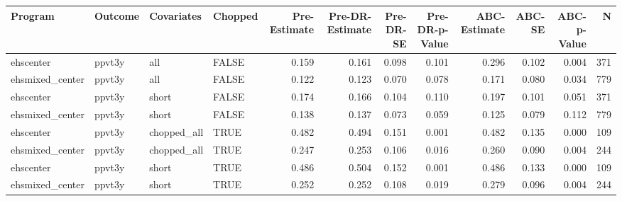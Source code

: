 \begin{table}[ht]
\centering
\begin{tabular}{llllrrrrrrrr}
  \hline
Program & Outcome & Covariates & Chopped & Pre-Estimate & Pre-DR-Estimate & Pre-DR-SE & Pre-DR-p-Value & ABC-Estimate & ABC-SE & ABC-p-Value & N \\ 
  \hline
ehscenter & ppvt3y & all & FALSE & 0.159 & 0.161 & 0.098 & 0.101 & 0.296 & 0.102 & 0.004 & 371 \\ 
  ehsmixed\_center & ppvt3y & all & FALSE & 0.122 & 0.123 & 0.070 & 0.078 & 0.171 & 0.080 & 0.034 & 779 \\ 
  ehscenter & ppvt3y & short & FALSE & 0.174 & 0.166 & 0.104 & 0.110 & 0.197 & 0.101 & 0.051 & 371 \\ 
  ehsmixed\_center & ppvt3y & short & FALSE & 0.138 & 0.137 & 0.073 & 0.059 & 0.125 & 0.079 & 0.112 & 779 \\ 
  ehscenter & ppvt3y & chopped\_all & TRUE & 0.482 & 0.494 & 0.151 & 0.001 & 0.482 & 0.135 & 0.000 & 109 \\ 
  ehsmixed\_center & ppvt3y & chopped\_all & TRUE & 0.247 & 0.253 & 0.106 & 0.016 & 0.260 & 0.090 & 0.004 & 244 \\ 
  ehscenter & ppvt3y & short & TRUE & 0.486 & 0.504 & 0.152 & 0.001 & 0.486 & 0.133 & 0.000 & 109 \\ 
  ehsmixed\_center & ppvt3y & short & TRUE & 0.252 & 0.252 & 0.108 & 0.019 & 0.279 & 0.096 & 0.004 & 244 \\ 
   \hline
\end{tabular}
\end{table}
